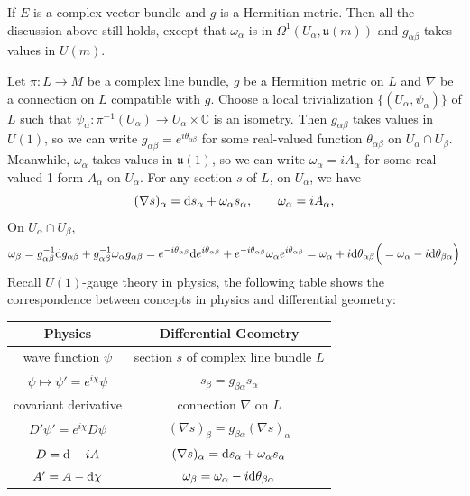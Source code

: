 If $E$ is a complex vector bundle and $g$ is a Hermitian metric. Then all the discussion above still holds, 
except that $\omega_\alpha$ is in $\Omega^1(U_\alpha,\mathfrak{u}(m))$ and $g_{\alpha\beta}$ takes values in $U(m)$. 

\begin{example}
    Let $\pi:L\to M$ be a complex line bundle, $g$ be a Hermition metric on $L$ and $\nabla$ be a connection on $L$ compatible with $g$. 
    Choose a local trivialization $\{(U_\alpha,\psi_\alpha)\}$ of $L$ such that $\psi_\alpha: \pi^{-1}(U_\alpha) \to U_\alpha \times \mathbb{C}$ is an isometry. 
    Then $g_{\alpha\beta}$ takes values in $U(1)$, so we can write $g_{\alpha\beta} = e^{i\theta_{\alpha\beta}}$ 
    for some real-valued function $\theta_{\alpha\beta}$ on $U_\alpha\cap U_\beta$. Meanwhile, $\omega_\alpha$ takes values in $\mathfrak{u}(1)$, 
    so we can write $\omega_\alpha = i A_\alpha$ for some real-valued 1-form $A_\alpha$ on $U_\alpha$.
    For any section $s$ of $L$, on $U_\alpha$, we have
    \begin{equation*}
        (\nabla s)_\alpha = {\rm d} s_\alpha + \omega_\alpha s_\alpha, \qquad \omega_\alpha = i A_\alpha,
    \end{equation*}
    On $U_\alpha\cap U_\beta$, 
    \begin{equation*}
        \omega_\beta = g_{\alpha\beta}^{-1}{\rm d} g_{\alpha\beta} + g_{\alpha\beta}^{-1}\omega_\alpha g_{\alpha\beta} 
        = e^{-i\theta_{\alpha\beta}} {\rm d} e^{i\theta_{\alpha\beta}} + e^{-i\theta_{\alpha\beta}} \omega_\alpha e^{i\theta_{\alpha\beta}} 
        = \omega_\alpha + i{\rm d} \theta_{\alpha\beta} \Big(= \omega_\alpha - i{\rm d} \theta_{\beta\alpha}\Big)
    \end{equation*}
    Recall $U(1)$-gauge theory in physics, 
    the following table shows the correspondence between concepts in physics and differential geometry:
    \begin{center}
    \begin{tabular}{|c|c|}
        \hline
        \textbf{Physics} & \textbf{Differential Geometry} \\
        \hline
        wave function $\psi$ & section $s$ of complex line bundle $L$ \\
        \hline
        $\psi\mapsto\psi'=e^{i\chi}\psi$ & $s_\beta=g_{\beta\alpha}s_\alpha$ \\
        \hline
        covariant derivative & connection $\nabla$ on $L$ \\
        \hline
        $D'\psi' = e^{i\chi} D\psi$ & $(\nabla s)_\beta=g_{\beta\alpha}(\nabla s)_\alpha$ \footnotemark \\
        \hline
        $D={\rm d}+iA$ & $(\nabla s)_\alpha={\rm d} s_\alpha+\omega_\alpha s_\alpha$ \\
        \hline
        $A'=A-{\rm d}\chi$ & $\omega_\beta=\omega_\alpha-i{\rm d}\theta_{\beta\alpha}$ \\
        \hline
    \end{tabular}
\end{center}
\end{example}

